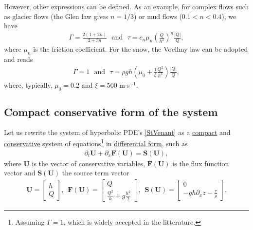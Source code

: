 \documentclass[a4paper]{article}
\numberwithin{equation}{section}
\begin{document}
	However, other expressions can be defined. As an example, for complex flows such as glacier flows (the Glen law gives $n=1/3$) or mud flows ($0.1<n<0.4$), we have
	\begin{align}
		\Gamma = \frac{2(1+2n)}{2+3n} \,\,\,\, \mathrm{and} \,\,\,\, \tau = c_n\mu_n \left( \frac{Q}{h^2} \right)^n \frac{|Q|}{Q},
	\end{align}
	where $\mu_n$ is the friction coefficient. For the snow, the Voellmy law can be adopted and reads
	\begin{align}
	\Gamma = 1 \,\,\,\, \mathrm{and} \,\,\,\, \tau = \rho g h \left( \mu_0 + \frac{1}{\xi}\frac{Q^2}{h^3} \right) \frac{|Q|}{Q},
	\end{align}
	where, typically, $\mu_0=0.2$ and $\xi=500$ m$\cdot$s$^{-1}$. 

	\subsection{Compact conservative form of the system}
	Let us rewrite the system of hyperbolic PDE's \ref{StVenant} as a \underline{compact} and \underline{conservative} system of equations\footnote{Assuming $\Gamma=1$, which is widely accepted in the litterature.} in \underline{differential form}, such as 
	\begin{align}
		\label{StVenantCompact}
		\partial_t \mathbf{U}+\partial_x \mathbf{F(U)} = \mathbf{S(U)},
	\end{align}
	where $\mathbf{U}$ is the vector of conservative variables, $\mathbf{F(U)}$ is the flux function vector and $\mathbf{S(U)}$ the source term vector
		\begin{align}
		\mathbf{U} = 
		\begin{bmatrix}
			h \\
			Q
		\end{bmatrix}, \,\,\,
		\mathbf{F(U)} = 
		\begin{bmatrix}
			Q \\
			\frac{Q^2}{h}+g\frac{h^2}{2}
		\end{bmatrix}, \,\,\,	
		\mathbf{S(U)} = 
		\begin{bmatrix}
			0 \\
			-gh\partial_{x}z-\frac{\tau}{\rho}
		\end{bmatrix}.
	\end{align}
\end{document}
